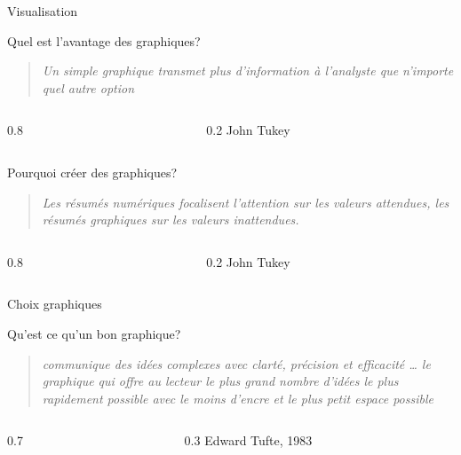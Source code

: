 \documentclass[
  ignorenonframetext,
]{beamer}
\begin{document}
\begin{frame}{Visualisation}
\protect{}\label{visualisation}
\begin{block}{Quel est l'avantage des graphiques?}
\protect{}\label{quel-est-lavantage-des-graphiques}
\begin{quote}
\emph{Un simple graphique transmet plus d'information à l'analyste que
n'importe quel autre option}
\end{quote}

\begin{columns}[T]
\begin{column}{0.8\linewidth}
\end{column}

\begin{column}{0.2\linewidth}
John Tukey
\end{column}
\end{columns}
\end{block}

\begin{block}{Pourquoi créer des graphiques?}
\protect{}\label{pourquoi-cruxe9er-des-graphiques}
\begin{quote}
\emph{Les résumés numériques focalisent l'attention sur les valeurs
attendues, les résumés graphiques sur les valeurs inattendues.}
\end{quote}

\begin{columns}[T]
\begin{column}{0.8\linewidth}
\end{column}

\begin{column}{0.2\linewidth}
John Tukey
\end{column}
\end{columns}
\end{block}
\end{frame}

\begin{frame}{Choix graphiques}
\protect{}\label{choix-graphiques}
\begin{block}{Qu'est ce qu'un bon graphique?}
\protect{}\label{quest-ce-quun-bon-graphique}
\begin{quote}
\emph{communique des idées complexes avec clarté, précision et
efficacité \ldots{} le graphique qui offre au lecteur le plus grand
nombre d'idées le plus rapidement possible avec le moins d'encre et le
plus petit espace possible}
\end{quote}

\begin{columns}[T]
\begin{column}{0.7\linewidth}
\end{column}

\begin{column}{0.3\linewidth}
Edward Tufte, 1983
\end{column}
\end{columns}
\end{block}
\end{frame}
\end{document}
